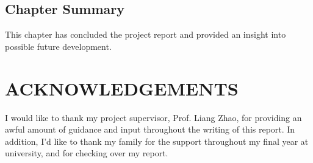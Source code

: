 \documentclass[12pt,a4paper]{article}
\begin{document}
\begin{comment}
	\subsection{Skills Attained}
	This project has helped the author to attain new skills as well as develop existing skills. The skills
attained have been both technical and individual with the main individual skill being project manage-
ment which required good time keeping and management of the workload. \\
Some technical skills that
have been developed include:
	\begin{itemize}
		\item Advanced coding using the Java Swing interface.
		\item Relational database schema design and trigger coding.
		\item Advanced coding using Java threads.
	\end{itemize}
\end{comment}
\subsection{Chapter Summary}	
This chapter has concluded the project report and provided an insight into possible future development.
	

\newpage

\section*{ACKNOWLEDGEMENTS}
	I would like to thank my project supervisor, Prof. Liang Zhao, for providing an awful amount of
guidance and input throughout the writing of this report. In addition, I’d like to thank my family for
the support throughout my final year at university, and for checking over my report.\\
\newpage

\end{document}
